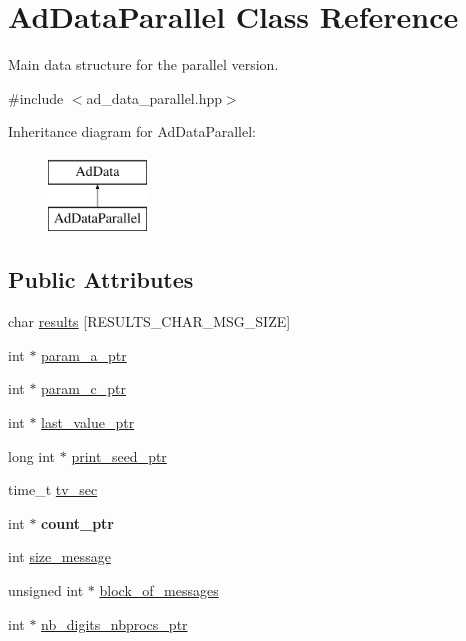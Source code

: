 \hypertarget{classAdDataParallel}{\section{\-Ad\-Data\-Parallel \-Class \-Reference}
\label{classAdDataParallel}
}


\-Main data structure for the parallel version.  




{\ttfamily \#include $<$ad\-\_\-data\-\_\-parallel.\-hpp$>$}

\-Inheritance diagram for \-Ad\-Data\-Parallel\-:\begin{figure}[H]
\begin{center}
\leavevmode
\includegraphics[height=2.000000cm]{classAdDataParallel}
\end{center}
\end{figure}
\subsection*{\-Public \-Attributes}
\begin{DoxyCompactItemize}
\item 
char \hyperlink{classAdDataParallel_a4919da41f748bd6286d59c9c9f72c344}{results} \mbox{[}\-R\-E\-S\-U\-L\-T\-S\-\_\-\-C\-H\-A\-R\-\_\-\-M\-S\-G\-\_\-\-S\-I\-Z\-E\mbox{]}
\item 
int $\ast$ \hyperlink{classAdDataParallel_adad4cfb99b07d696333c7f9f7dd1bc5c}{param\-\_\-a\-\_\-ptr}
\item 
int $\ast$ \hyperlink{classAdDataParallel_ade1456a48c972070bab91e0a93cd61dd}{param\-\_\-c\-\_\-ptr}
\item 
int $\ast$ \hyperlink{classAdDataParallel_abadd43c4d0470ab910005d8870175427}{last\-\_\-value\-\_\-ptr}
\item 
long int $\ast$ \hyperlink{classAdDataParallel_a5391ad235753151f07dfc1c01d58e88d}{print\-\_\-seed\-\_\-ptr}
\item 
time\-\_\-t \hyperlink{classAdDataParallel_ac69a52aa7b4b4b9c61f9bfaea3ec2143}{tv\-\_\-sec}
\item 
\hypertarget{classAdDataParallel_a5db14ef93884ad280df71bc035d5427d}{int $\ast$ {\bfseries count\-\_\-ptr}}\label{classAdDataParallel_a5db14ef93884ad280df71bc035d5427d}

\item 
int \hyperlink{classAdDataParallel_a5ecf007c3aa55587262e26277f57bdf3}{size\-\_\-message}
\item 
unsigned int $\ast$ \hyperlink{classAdDataParallel_a9451414d03458e18a43331bc8eeb9db0}{block\-\_\-of\-\_\-messages}
\item 
int $\ast$ \hyperlink{classAdDataParallel_a9eab29cd926fd30d469875cf539dc7ba}{nb\-\_\-digits\-\_\-nbprocs\-\_\-ptr}
\end{DoxyCompactItemize}


